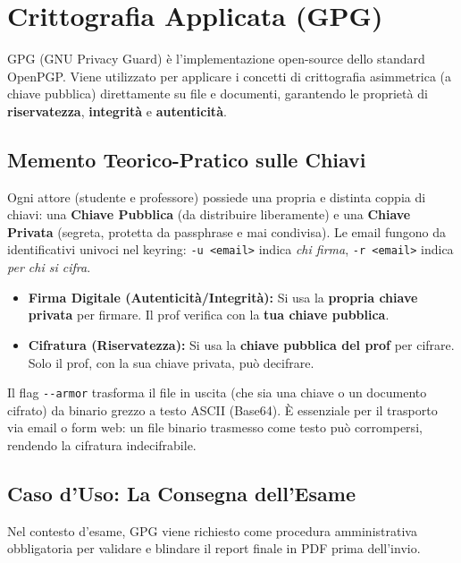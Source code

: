 \documentclass[12pt,a4paper]{report}
\begin{document}
	\section{Crittografia Applicata (GPG)}
	
	GPG (GNU Privacy Guard) è l'implementazione open-source dello standard OpenPGP.
	Viene utilizzato per applicare i concetti di crittografia asimmetrica (a chiave pubblica)
	direttamente su file e documenti, garantendo le proprietà di \textbf{riservatezza},
	\textbf{integrità} e \textbf{autenticità}.
	
	\subsection{Memento Teorico-Pratico sulle Chiavi}
	
	Ogni attore (studente e professore) possiede una propria e distinta coppia di chiavi:
	una \textbf{Chiave Pubblica} (da distribuire liberamente) e una \textbf{Chiave Privata}
	(segreta, protetta da passphrase e mai condivisa). Le email fungono da
	identificativi univoci nel keyring: \texttt{-u <email>} indica \textit{chi firma},
	\texttt{-r <email>} indica \textit{per chi si cifra}.
	
	\begin{itemize}
		\item \textbf{Firma Digitale (Autenticità/Integrità):} Si usa la \textbf{propria
			chiave privata} per firmare. Il prof verifica con la \textbf{tua chiave pubblica}.
		\item \textbf{Cifratura (Riservatezza):} Si usa la \textbf{chiave pubblica del prof}
		per cifrare. Solo il prof, con la sua chiave privata, può decifrare.
	\end{itemize}
	
	\begin{nota}[NOTA]
		Il flag \texttt{{-}{-}armor} trasforma il file in uscita (che sia una chiave o un documento cifrato) da binario grezzo
		a testo ASCII (Base64). È essenziale per il trasporto via email o form web: un file
		binario trasmesso come testo può corrompersi, rendendo la cifratura indecifrabile.
	\end{nota}
	
	\subsection{Caso d'Uso: La Consegna dell'Esame}
	
	Nel contesto d'esame, GPG viene richiesto come procedura amministrativa obbligatoria
	per validare e blindare il report finale in PDF prima dell'invio.
	
\end{document}
